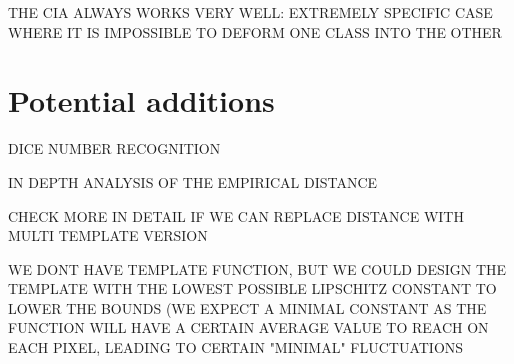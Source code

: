 \documentclass{article}
\theoremstyle{definition}
\theoremstyle{remark}
\theoremstyle{proposition}
\begin{document}
            THE CIA ALWAYS WORKS VERY WELL: EXTREMELY SPECIFIC CASE WHERE IT IS IMPOSSIBLE TO DEFORM ONE CLASS INTO THE OTHER 

        \section{Potential additions}

        DICE NUMBER RECOGNITION

        IN DEPTH ANALYSIS OF THE EMPIRICAL DISTANCE

        CHECK MORE IN DETAIL IF WE CAN REPLACE DISTANCE WITH MULTI TEMPLATE VERSION

        WE DONT HAVE TEMPLATE FUNCTION, BUT WE COULD DESIGN THE TEMPLATE WITH THE LOWEST POSSIBLE LIPSCHITZ CONSTANT TO LOWER THE BOUNDS (WE EXPECT A MINIMAL CONSTANT AS THE FUNCTION WILL HAVE A CERTAIN AVERAGE VALUE TO REACH ON EACH PIXEL, LEADING TO CERTAIN "MINIMAL" FLUCTUATIONS
        
        \cite{arXiv:2206.02151v2}
        \cite{Image-deformation-model}


\end{document}
